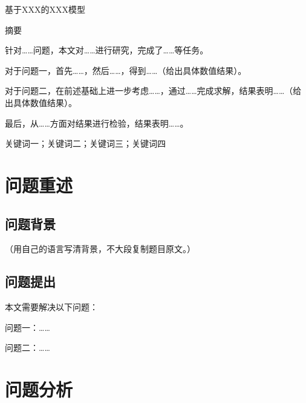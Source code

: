 \documentclass[12pt, a4paper]{ctexart}
\newcommand{\xiaoer}{\fontsize{18pt}{22pt}\selectfont}   %
\newcommand{\sanhao}{\fontsize{16pt}{20pt}\selectfont}   %
\begin{document}

\begin{center}
  {\heiti\xiaoer 基于XXX的XXX模型}
\end{center}
\vspace{18pt}

\begin{center}
  {\heiti\sanhao 摘\quad 要}
\end{center}
\vspace{6pt}

针对……问题，本文对……进行研究，完成了……等任务。

对于问题一，首先……，然后……，得到……（给出具体数值结果）。

对于问题二，在前述基础上进一步考虑……，通过……完成求解，结果表明……（给出具体数值结果）。

最后，从……方面对结果进行检验，结果表明……。

\vspace{6pt}
\quad 关键词一；关键词二；关键词三；关键词四

\newpage

\section{问题重述}

\subsection{问题背景}
（用自己的语言写清背景，不大段复制题目原文。）

\subsection{问题提出}
本文需要解决以下问题：

问题一：……

问题二：……

\section{问题分析}
\end{document}
